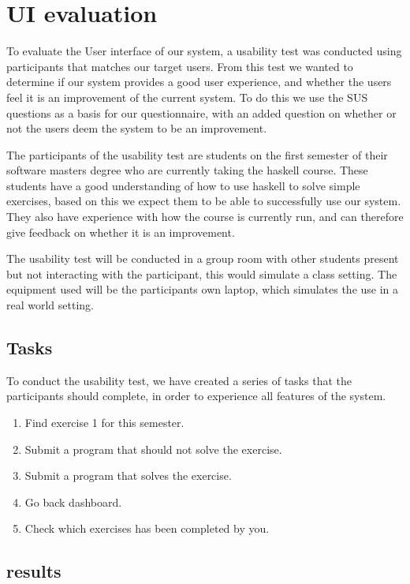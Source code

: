 \section{UI evaluation}
To evaluate the User interface of our system, a usability test was conducted using participants that matches our target users. From this test we wanted to determine if our system provides a good user experience, and whether the users feel it is an improvement of the current system.
To do this we use the SUS questions as a basis for our questionnaire, with an added question on whether or not the users deem the system to be an improvement.

The participants of the usability test are students on the first semester of their software masters degree who are currently taking the haskell course. 
These students have a good understanding of how to use haskell to solve simple exercises, based on this we expect them to be able to successfully use our system. They also have experience with how the course is currently run, and can therefore give feedback on whether it is an improvement.

The usability test will be conducted in a group room with other students present but not interacting with the participant, this would simulate a class setting. 
The equipment used will be the participants own laptop, which simulates the use in a real world setting.

\subsection*{Tasks}
To conduct the usability test, we have created a series of tasks that the participants should complete, in order to experience all features of the system.

\begin{enumerate}
    \item Find exercise 1 for this semester.
    \item Submit a program that should not solve the exercise.
    \item Submit a program that solves the exercise.
    \item Go back dashboard.
    \item Check which exercises has been completed by you.
\end{enumerate}



\subsection*{results}

